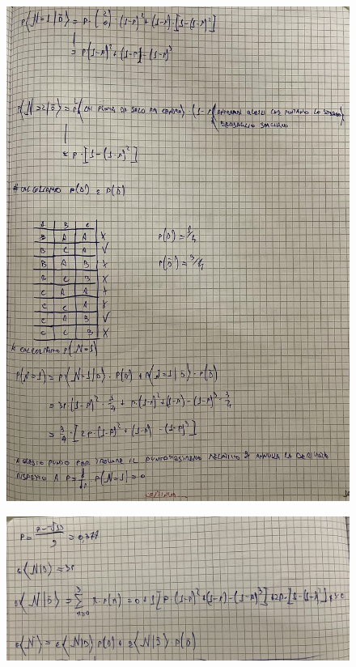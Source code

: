 \documentclass{article}
\begin{document}
\begin{figure}[H]
\centering
\includegraphics[scale=0.10]{ese/39a.jpeg}
\end{figure}
\begin{figure}[H]
\centering
\includegraphics[scale=0.10]{ese/39b.jpeg}
\end{figure}
\end{document}
